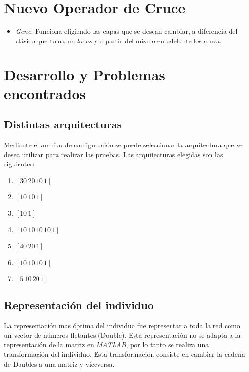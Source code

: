 \documentclass{sig-alternate}
\begin{document}
\section{Nuevo Operador de Cruce}

	\begin{itemize}
		\item \textit{Gene}: Funciona eligiendo las capas que se desean cambiar, a diferencia del clásico que toma un \textit{locus} y a partir del mismo en adelante los cruza.
	\end{itemize}

\section{Desarrollo y Problemas encontrados}

	\subsection{Distintas arquitecturas}

	Mediante el archivo de configuración se puede seleccionar la arquitectura que se desea utilizar para realizar las pruebas. Las arquitecturas elegidas son las siguientes:

	\begin{center}
		\begin{enumerate}
			\item $[30\,20\,10\,1]$
			\item $[10\,10\,1]$
			\item $[10\,1]$
			\item $[10\,10\,10\,10\,1]$
			\item $[40\,20\,1]$
			\item $[10\,10\,10\,1]$
			\item $[5\,10\,20\,1]$
		\end{enumerate}
	\end{center}

	\subsection{Representación del individuo}

	La representación mas óptima del individuo fue representar a toda la red como un vector de números flotantes (Double). Esta representación no se adapta a la representación de la matriz en \textit{MATLAB}, por lo tanto se realiza una transformación del individuo. Esta transformación consiste en cambiar la cadena de Doubles a una matriz y viceversa.
\end{document}
